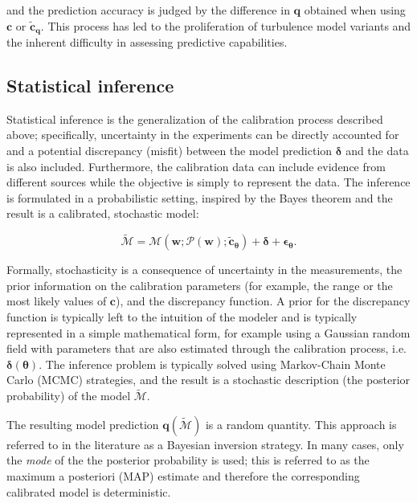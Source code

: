 \documentclass[a4paper]{ar-1col}
\begin{document}
\noindent and the prediction accuracy is judged by the difference in $\mathbf{q}$ obtained when using $\mathbf{c}$ or $ \tilde{ \mathbf{c}}_\mathbf{q}$.
 This process has led to the proliferation of turbulence model variants and the inherent difficulty in assessing predictive capabilities.
 

\subsection{Statistical inference}

Statistical inference is the generalization of the calibration process described above; specifically, uncertainty in the experiments can be directly accounted for and
a potential  discrepancy (misfit) between the model prediction $ \bm{\delta}$ and the data is also included. Furthermore, the calibration data can include evidence from different
sources while the  objective is simply to represent the data. The inference is  formulated in a probabilistic setting, inspired by the Bayes theorem and the result is a calibrated, stochastic model:

   \begin{equation}
 \widetilde{ \mathcal M} = \mathcal M (   \mathbf{w}; \mathcal P(  \mathbf{w}  );    \tilde{ \mathbf{c}}_{\bm{\theta}} ) +  \bm{\delta} + \bm{\epsilon}_{\bm{\theta}}.    
 \label{eq:inteference} 
 \end{equation}
 
 

Formally, stochasticity is a consequence of uncertainty in the measurements, the prior information on the calibration parameters (for example, the range or the most likely values of $\mathbf{c}$), and the discrepancy function. A prior for the discrepancy function is typically left to the intuition of the modeler and is typically represented in a simple mathematical form, for example using a Gaussian random field with parameters that are also estimated through the calibration process, i.e. $\bm{\delta}(\bm{\theta})$. The inference problem is typically solved using Markov-Chain Monte Carlo (MCMC) strategies, and the result is a stochastic description (the posterior probability) of the model $ \widetilde{ \mathcal M}$.

The resulting model prediction $\mathbf{q}( \widetilde{ \mathcal M} )$ is  a random quantity.
This approach is referred to in the literature 
as a Bayesian inversion strategy.  
  In many cases,  only the {\it mode} of the the posterior probability is used; this is referred to as the maximum a posteriori (MAP) estimate and therefore the corresponding calibrated model is deterministic. 
\end{document}
